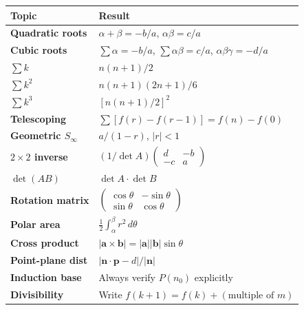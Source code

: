 \documentclass[12pt,a4paper]{article}
\theoremstyle{defstyle}
\begin{document}
\clearpage
\begin{tcolorbox}[colback=chaptercol!6, colframe=chaptercol, left=8pt, right=8pt, top=6pt, bottom=6pt,
  title={\bfseries\large Key Results --- Further Pure Mathematics 1}]
\renewcommand{\arraystretch}{1.8}
\begin{center}
\small
\begin{tabular}{>{\bfseries}p{3.8cm} p{9cm}}
\toprule
Topic & Result \\
\midrule
Quadratic roots & $\alpha+\beta=-b/a$,\; $\alpha\beta=c/a$ \\
Cubic roots     & $\sum\alpha=-b/a$,\; $\sum\alpha\beta=c/a$,\; $\alpha\beta\gamma=-d/a$ \\
$\sum k$        & $n(n+1)/2$ \\
$\sum k^2$      & $n(n+1)(2n+1)/6$ \\
$\sum k^3$      & $[n(n+1)/2]^2$ \\
Telescoping     & $\sum[f(r)-f(r-1)]=f(n)-f(0)$ \\
Geometric $S_\infty$ & $a/(1-r)$,\; $|r|<1$ \\
$2\times2$ inverse & $(1/\det A)\begin{pmatrix}d&-b\\-c&a\end{pmatrix}$ \\
$\det(AB)$      & $\det A\cdot\det B$ \\
Rotation matrix & $\begin{pmatrix}\cos\theta&-\sin\theta\\\sin\theta&\cos\theta\end{pmatrix}$ \\
Polar area      & $\frac{1}{2}\int_\alpha^\beta r^2\,d\theta$ \\
Cross product   & $|\mathbf{a}\times\mathbf{b}|=|\mathbf{a}||\mathbf{b}|\sin\theta$ \\
Point-plane dist & $|\mathbf{n}\cdot\mathbf{p}-d|/|\mathbf{n}|$ \\
Induction base  & Always verify $P(n_0)$ explicitly \\
Divisibility    & Write $f(k+1)=f(k)+(\text{multiple of }m)$ \\
\bottomrule
\end{tabular}
\end{center}
\end{tcolorbox}
\end{document}
